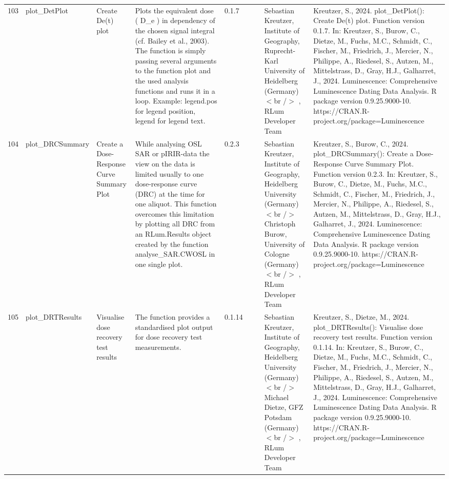 \begin{table}[ht]
\begin{tabular}{rllllllll}
 \\ 
  103 & plot\_DetPlot & Create De(t) plot & Plots the equivalent dose ( D\_e ) in dependency of the chosen signal integral (cf. Bailey et al., 2003). The function is simply passing several arguments to the function  plot  and the used analysis functions and runs it in a loop. Example:  legend.pos  for legend position,  legend  for legend text. & 0.1.7
 &  &  & Sebastian Kreutzer, Institute of Geography, Ruprecht-Karl University of Heidelberg (Germany)$<$br /$>$ , RLum Developer Team & Kreutzer, S., 2024. plot\_DetPlot(): Create De(t) plot. Function version 0.1.7. In: Kreutzer, S., Burow, C., Dietze, M., Fuchs, M.C., Schmidt, C., Fischer, M., Friedrich, J., Mercier, N., Philippe, A., Riedesel, S., Autzen, M., Mittelstrass, D., Gray, H.J., Galharret, J., 2024. Luminescence: Comprehensive Luminescence Dating Data Analysis. R package version 0.9.25.9000-10. https://CRAN.R-project.org/package=Luminescence
 \\ 
  104 & plot\_DRCSummary & Create a Dose-Response Curve Summary Plot & While analysing OSL SAR or pIRIR-data the view on the data is limited usually to one dose-response curve (DRC) at the time for one aliquot. This function overcomes this limitation by plotting all DRC from an  RLum.Results  object created by the function  analyse\_SAR.CWOSL  in one single plot. & 0.2.3
 &  &  & Sebastian Kreutzer, Institute of Geography, Heidelberg University (Germany)  $<$br /$>$ Christoph Burow, University of Cologne (Germany)$<$br /$>$ , RLum Developer Team & Kreutzer, S., Burow, C., 2024. plot\_DRCSummary(): Create a Dose-Response Curve Summary Plot. Function version 0.2.3. In: Kreutzer, S., Burow, C., Dietze, M., Fuchs, M.C., Schmidt, C., Fischer, M., Friedrich, J., Mercier, N., Philippe, A., Riedesel, S., Autzen, M., Mittelstrass, D., Gray, H.J., Galharret, J., 2024. Luminescence: Comprehensive Luminescence Dating Data Analysis. R package version 0.9.25.9000-10. https://CRAN.R-project.org/package=Luminescence
 \\ 
  105 & plot\_DRTResults & Visualise dose recovery test results & The function provides a standardised plot output for dose recovery test measurements. & 0.1.14
 &  &  & Sebastian Kreutzer, Institute of Geography, Heidelberg University (Germany) $<$br /$>$ Michael Dietze, GFZ Potsdam (Germany)$<$br /$>$ , RLum Developer Team & Kreutzer, S., Dietze, M., 2024. plot\_DRTResults(): Visualise dose recovery test results. Function version 0.1.14. In: Kreutzer, S., Burow, C., Dietze, M., Fuchs, M.C., Schmidt, C., Fischer, M., Friedrich, J., Mercier, N., Philippe, A., Riedesel, S., Autzen, M., Mittelstrass, D., Gray, H.J., Galharret, J., 2024. Luminescence: Comprehensive Luminescence Dating Data Analysis. R package version 0.9.25.9000-10. https://CRAN.R-project.org/package=Luminescence

\end{tabular}
\end{table}
